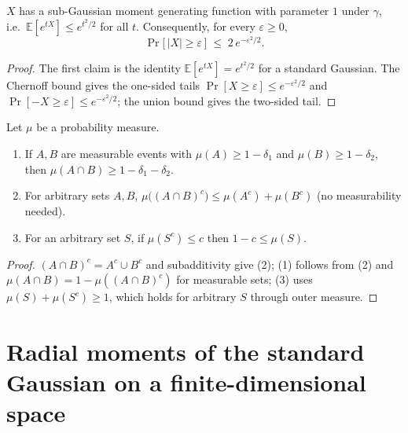 \begin{lemma}\label{lem:ntkf:subGaussTail}
  \leanok
$X$ has a sub-Gaussian moment generating function with parameter $1$ under $\gamma$,
i.e.\ $\mathbb E[e^{tX}]\le e^{t^2/2}$ for all $t$. Consequently, for every
$\varepsilon\ge0$,
\[
  \Pr\bigl[\,|X|\ge\varepsilon\,\bigr]\;\le\;2\,e^{-\varepsilon^2/2}.
\]
\end{lemma}

\begin{proof}
  \leanok
The first claim is the identity $\mathbb E[e^{tX}]=e^{t^2/2}$ for a standard Gaussian. The
Chernoff bound gives the one-sided tails $\Pr[X\ge\varepsilon]\le e^{-\varepsilon^2/2}$ and
$\Pr[-X\ge\varepsilon]\le e^{-\varepsilon^2/2}$; the union bound gives the two-sided tail.
\end{proof}

\begin{lemma}\label{lem:ntkf:measureAlgebra}
  \leanok
Let $\mu$ be a probability measure.
\begin{enumerate}
  \item If $A,B$ are measurable events with $\mu(A)\ge1-\delta_1$ and $\mu(B)\ge1-\delta_2$,
        then $\mu(A\cap B)\ge1-\delta_1-\delta_2$.
  \item For arbitrary sets $A,B$, $\mu\bigl((A\cap B)^c\bigr)\le\mu(A^c)+\mu(B^c)$ (no measurability needed).
  \item For an arbitrary set $S$, if $\mu(S^c)\le c$ then $1-c\le\mu(S)$.
\end{enumerate}
\end{lemma}

\begin{proof}
  \leanok
$(A\cap B)^c=A^c\cup B^c$ and subadditivity give (2); (1) follows from (2) and
$\mu(A\cap B)=1-\mu((A\cap B)^c)$ for measurable sets; (3) uses $\mu(S)+\mu(S^c)\ge1$, which holds
for arbitrary $S$ through outer measure.
\end{proof}


\section{Radial moments of the standard Gaussian on a finite-dimensional space}\label{sec:ntkf:radial}

